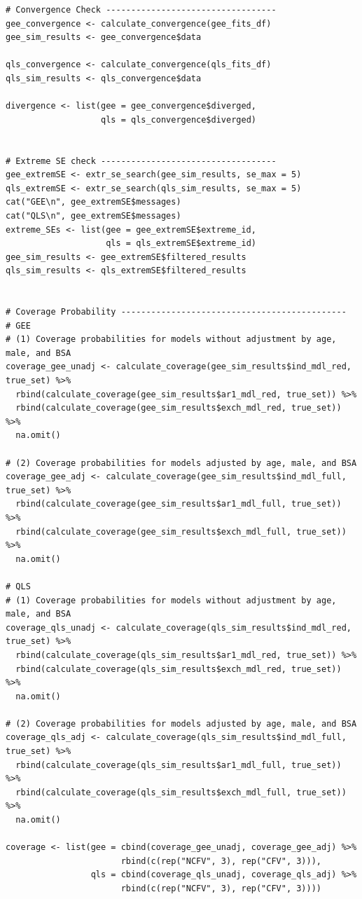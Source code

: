 \documentclass[
]{aft}
\begin{document}
\begin{verbatim}
# Convergence Check ----------------------------------
gee_convergence <- calculate_convergence(gee_fits_df)
gee_sim_results <- gee_convergence$data

qls_convergence <- calculate_convergence(qls_fits_df)
qls_sim_results <- qls_convergence$data

divergence <- list(gee = gee_convergence$diverged, 
                   qls = qls_convergence$diverged)


# Extreme SE check -----------------------------------
gee_extremSE <- extr_se_search(gee_sim_results, se_max = 5)
qls_extremSE <- extr_se_search(qls_sim_results, se_max = 5)
cat("GEE\n", gee_extremSE$messages)
cat("QLS\n", gee_extremSE$messages)
extreme_SEs <- list(gee = gee_extremSE$extreme_id, 
                    qls = qls_extremSE$extreme_id)
gee_sim_results <- gee_extremSE$filtered_results
qls_sim_results <- qls_extremSE$filtered_results


# Coverage Probability ---------------------------------------------
# GEE 
# (1) Coverage probabilities for models without adjustment by age, male, and BSA
coverage_gee_unadj <- calculate_coverage(gee_sim_results$ind_mdl_red, true_set) %>%
  rbind(calculate_coverage(gee_sim_results$ar1_mdl_red, true_set)) %>%
  rbind(calculate_coverage(gee_sim_results$exch_mdl_red, true_set)) %>%
  na.omit()

# (2) Coverage probabilities for models adjusted by age, male, and BSA
coverage_gee_adj <- calculate_coverage(gee_sim_results$ind_mdl_full, true_set) %>%
  rbind(calculate_coverage(gee_sim_results$ar1_mdl_full, true_set)) %>%
  rbind(calculate_coverage(gee_sim_results$exch_mdl_full, true_set)) %>%
  na.omit()

# QLS
# (1) Coverage probabilities for models without adjustment by age, male, and BSA
coverage_qls_unadj <- calculate_coverage(qls_sim_results$ind_mdl_red, true_set) %>%
  rbind(calculate_coverage(qls_sim_results$ar1_mdl_red, true_set)) %>%
  rbind(calculate_coverage(qls_sim_results$exch_mdl_red, true_set)) %>%
  na.omit()

# (2) Coverage probabilities for models adjusted by age, male, and BSA
coverage_qls_adj <- calculate_coverage(qls_sim_results$ind_mdl_full, true_set) %>%
  rbind(calculate_coverage(qls_sim_results$ar1_mdl_full, true_set)) %>%
  rbind(calculate_coverage(qls_sim_results$exch_mdl_full, true_set)) %>%
  na.omit()

coverage <- list(gee = cbind(coverage_gee_unadj, coverage_gee_adj) %>% 
                       rbind(c(rep("NCFV", 3), rep("CFV", 3))), 
                 qls = cbind(coverage_qls_unadj, coverage_qls_adj) %>% 
                       rbind(c(rep("NCFV", 3), rep("CFV", 3))))



\end{verbatim}
\end{document}
